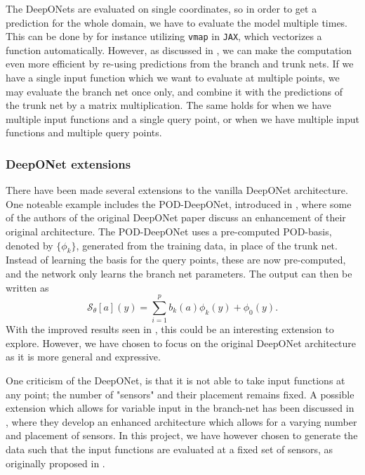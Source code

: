 The DeepONets are evaluated on single coordinates, so in order to get a prediction for the whole domain, we have to evaluate the model multiple times. 
This can be done by for instance utilizing \texttt{vmap} in \texttt{JAX}, which vectorizes a function automatically. However, as discussed in , we can
make the computation even more efficient by re-using predictions from the branch and trunk nets. If we have a single input function which we want to evaluate at multiple points,
we may evaluate the branch net once only, and combine it with the predictions of the trunk net by a matrix multiplication. The same holds for when we have multiple input functions and a single query point,
or when we have multiple input functions and multiple query points.

\subsubsection{DeepONet extensions}

There have been made several extensions to the vanilla DeepONet architecture. One noteable example includes the POD-DeepONet, 
introduced in , where some of the authors of the original DeepONet paper 
discuss an enhancement of their original architecture. 
The POD-DeepONet uses a pre-computed POD-basis, denoted by \(\{\phi_k\}\), generated from the training data, in place of the trunk net.
Instead of learning the basis for the query points, these are now pre-computed, and the network only learns the branch net parameters.
The output can then be written as 
\begin{equation}
    \mathcal{S}_\theta[a](y) = \sum_{i=1}^p b_k(a) \phi_k(y) + \phi_0(y).
    \label{eq:POD-DeepONet}
\end{equation}
With the improved results seen in \cite{luComprehensiveFairComparison2022}, this could be an interesting extension to explore. However, we have chosen
to focus on the original DeepONet architecture as it is more general and expressive.

One criticism of the DeepONet, is that it is not able to take input functions at any point; the number of "sensors" and their placement remains fixed.
A possible extension which allows for variable input in the branch-net has been discussed in , 
where they develop an enhanced architecture which allows for a varying number and placement of sensors. 
In this project, we have however chosen to generate the data such that the input functions are evaluated at a fixed set of sensors, as originally proposed in \cite{luDeepONetLearningNonlinear2021}.

